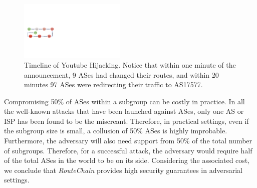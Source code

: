 \documentclass[5p]{elsarticle}
\newcommand{\rc}{{{\em RouteChain}}\xspace}
\begin{document}
\begin{figure}[t]
\begin{center}
\includegraphics[width=0.45\textwidth]{fig/123.pdf}
\caption{Timeline of Youtube Hijacking. Notice that within one minute of the announcement, 9 ASes had changed their routes, and within 20 minutes 97 ASes were redirecting their traffic to AS17577.} 
\label{fig:YThijack}
\end{center}
\end{figure}

Compromising 50\% of ASes within a subgroup can be costly in practice. In all the well-known attacks that have been launched against ASes, only one AS or ISP has been found to be the miscreant. Therefore, in practical settings, even if the subgroup size is small, a collusion of 50\% ASes is highly improbable. Furthermore, the adversary will also need support from 50\% of the total number of subgroups. Therefore, for a successful attack, the adversary would require half of the total ASes in the world to be on its side. Considering the associated cost, we conclude that \rc provides high security guarantees in adversarial settings.  



\end{document}
